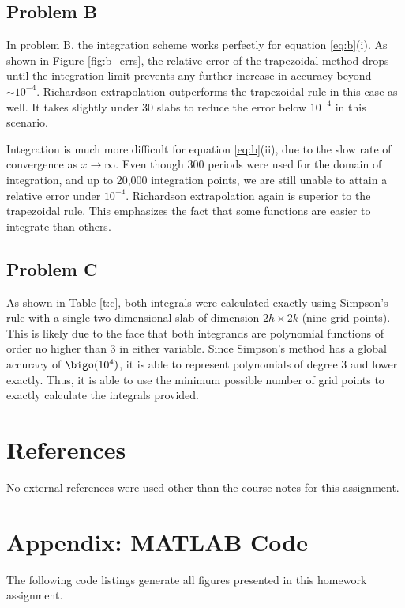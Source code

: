 \documentclass[12pt]{article}
\begin{document}
\subsection{Problem B}

In problem B, the integration scheme works perfectly for equation \eqref{eq:b}(i). As shown in Figure \ref{fig:b_errs}, the relative error of the trapezoidal method drops until the integration limit prevents any further increase in accuracy beyond $\sim 10^{-4}$. Richardson extrapolation outperforms the trapezoidal rule in this case as well. It takes slightly under 30 slabs to reduce the error below $10^{-4}$ in this scenario.

Integration is much more difficult for equation \eqref{eq:b}(ii), due to the slow rate of convergence as $x \rightarrow \infty$. Even though 300 periods were used for the domain of integration, and up to 20,000 integration points, we are still unable to attain a relative error under $10^{-4}$. Richardson extrapolation again is superior to the trapezoidal rule. This emphasizes the fact that some functions are easier to integrate than others.

\subsection{Problem C}

As shown in Table \ref{t:c}, both integrals were calculated exactly using Simpson's rule with a single two-dimensional slab of dimension $2h \times 2k$ (nine grid points). This is likely due to the face that both integrands are polynomial functions of order no higher than $3$ in either variable. Since Simpson's method has a global accuracy of $\bigo(10^{4})$, it is able to represent polynomials of degree $3$ and lower exactly. Thus, it is able to use the minimum possible number of grid points to exactly calculate the integrals provided.

\section{References}

No external references were used other than the course notes for this assignment.

\section*{Appendix: MATLAB Code}
The following code listings generate all figures presented in this homework assignment.




\end{document}

